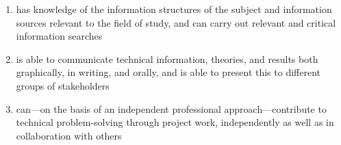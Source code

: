 \begin{enumerate}
    \item has knowledge of the information structures of the subject and information sources relevant to the field of study, and can carry out relevant and critical information searches

    \item is able to communicate technical information, theories, and results both graphically, in writing, and orally, and is able to present this to different groups of stakeholders

    \item can—on the basis of an independent professional approach—contribute to technical problem-solving through project work, independently as well as in collaboration with others


\end{enumerate}